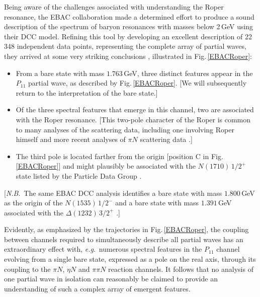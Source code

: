 Being aware of the challenges associated with understanding the Roper resonance, the EBAC collaboration made a determined effort to produce a sound description of the spectrum of baryon resonances with masses below 2\,GeV using their DCC model.  Refining this tool by developing an excellent description of 22\,348 independent data points, representing the complete array of partial waves, they arrived at some very striking conclusions \cite{JuliaDiaz:2007kz, Suzuki:2009nj, Kamano:2010ud}, illustrated in Fig.\,\ref{EBACRoper}:\\[-4ex]
%
\begin{itemize}
\setlength\itemsep{0em}
\item From a bare state with mass $1.763\,$GeV, three distinct features appear in the $P_{11}$ partial wave, as described by Fig.\,\ref{EBACRoper}.  [We will subsequently return to the interpretation of the bare state.]
%
\item Of the three spectral features that emerge in this channel, two are associated with the Roper resonance.  [This two-pole character of the Roper is common to many analyses of the scattering data, including one involving Roper himself \cite{Arndt:1985vj} and more recent analyses of $\pi N$ scattering data \cite{Cutkosky:1990zh, Arndt:2006bf, Doring:2009yv}.]
%
\item The third pole is located farther from the origin [position C in Fig.\,\ref{EBACRoper}] and might plausibly be associated with the $N(1710)\,1/2^+$ state listed by the Particle Data Group \cite{Olive:2016xmw}.
%

\end{itemize}
[\emph{N.B}.\ The same EBAC DCC analysis identifies a bare state with mass $1.800\,$GeV as the origin of the $N(1535)\,1/2^-$ and a bare state with mass $1.391\,$GeV associated with the $\Delta(1232)\,3/2^+$ \cite{JuliaDiaz:2007kz}.]

Evidently, as emphasized by the trajectories in Fig.\,\ref{EBACRoper}, the coupling between channels required to simultaneously describe all partial waves has an extraordinary effect with, \emph{e.g}.\ numerous spectral features in the $P_{11}$ channel evolving from a single bare state, expressed as a pole on the real axis, through its coupling to the $\pi N$, $\eta N$ and $\pi\pi N$ reaction channels.  It follows that no analysis of one partial wave in isolation can reasonably be claimed to provide an understanding of such a complex array of emergent features.

